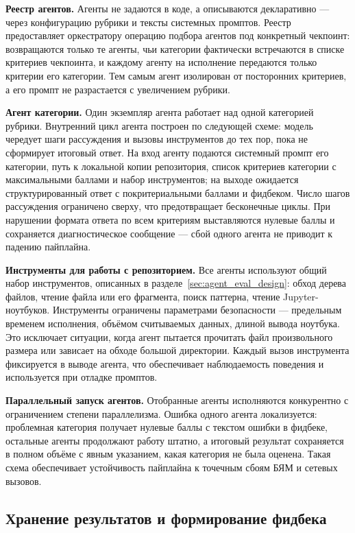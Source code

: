 \textbf{Реестр агентов.} Агенты не задаются в коде, а описываются
декларативно --- через конфигурацию рубрики и тексты системных
промптов. Реестр предоставляет оркестратору операцию подбора
агентов под конкретный чекпоинт: возвращаются только те агенты, чьи
категории фактически встречаются в списке критериев чекпоинта,
и каждому агенту на исполнение передаются только критерии его
категории. Тем самым агент изолирован от посторонних критериев, а
его промпт не разрастается с увеличением рубрики.

\textbf{Агент категории.} Один экземпляр агента работает над одной
категорией рубрики. Внутренний цикл агента построен по
следующей схеме: модель чередует шаги рассуждения и вызовы
инструментов до тех пор, пока не сформирует итоговый ответ.
На вход агенту подаются системный промпт его категории, путь к
локальной копии репозитория, список критериев категории с
максимальными баллами и набор инструментов; на выходе ожидается
структурированный ответ с покритериальными баллами и фидбеком.
Число шагов рассуждения ограничено сверху, что предотвращает
бесконечные циклы. При нарушении формата ответа по всем критериям
выставляются нулевые баллы и сохраняется диагностическое сообщение
--- сбой одного агента не приводит к падению пайплайна.

\textbf{Инструменты для работы с репозиторием.} Все агенты
используют общий набор инструментов, описанных в
разделе~\ref{sec:agent_eval_design}: обход дерева файлов, чтение
файла или его фрагмента, поиск паттерна, чтение Jupyter-ноутбуков.
Инструменты ограничены параметрами безопасности --- предельным
временем исполнения, объёмом считываемых данных, длиной вывода
ноутбука. Это исключает ситуации, когда агент пытается прочитать
файл произвольного размера или зависает на обходе большой
директории. Каждый вызов инструмента фиксируется в выводе агента,
что обеспечивает наблюдаемость поведения и используется при отладке
промптов.

\textbf{Параллельный запуск агентов.} Отобранные агенты исполняются
конкурентно с ограничением степени параллелизма. Ошибка одного
агента локализуется: проблемная категория получает нулевые баллы с
текстом ошибки в фидбеке, остальные агенты продолжают работу штатно,
а итоговый результат сохраняется в полном объёме с явным указанием,
какая категория не была оценена. Такая схема обеспечивает
устойчивость пайплайна к точечным сбоям БЯМ и сетевых вызовов.

\subsection{Хранение результатов и формирование фидбека}

